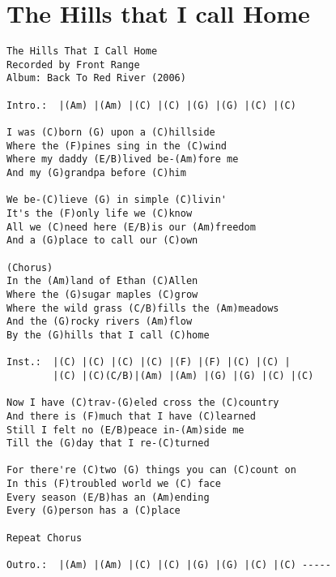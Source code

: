 \documentclass[leqno]{memoir}
\begin{document}
\chapter{The Hills that I call Home}
\begin{verbatim}
The Hills That I Call Home
Recorded by Front Range
Album: Back To Red River (2006)

Intro.:  |(Am) |(Am) |(C) |(C) |(G) |(G) |(C) |(C)

I was (C)born (G) upon a (C)hillside
Where the (F)pines sing in the (C)wind
Where my daddy (E/B)lived be-(Am)fore me
And my (G)grandpa before (C)him

We be-(C)lieve (G) in simple (C)livin'
It's the (F)only life we (C)know
All we (C)need here (E/B)is our (Am)freedom
And a (G)place to call our (C)own

(Chorus)
In the (Am)land of Ethan (C)Allen
Where the (G)sugar maples (C)grow
Where the wild grass (C/B)fills the (Am)meadows
And the (G)rocky rivers (Am)flow
By the (G)hills that I call (C)home

Inst.:  |(C) |(C) |(C) |(C) |(F) |(F) |(C) |(C) |
        |(C) |(C)(C/B)|(Am) |(Am) |(G) |(G) |(C) |(C)

Now I have (C)trav-(G)eled cross the (C)country
And there is (F)much that I have (C)learned
Still I felt no (E/B)peace in-(Am)side me
Till the (G)day that I re-(C)turned

For there're (C)two (G) things you can (C)count on
In this (F)troubled world we (C) face
Every season (E/B)has an (Am)ending
Every (G)person has a (C)place

Repeat Chorus

Outro.:  |(Am) |(Am) |(C) |(C) |(G) |(G) |(C) |(C) -----
\end{verbatim}
\newpage
\end{document}
